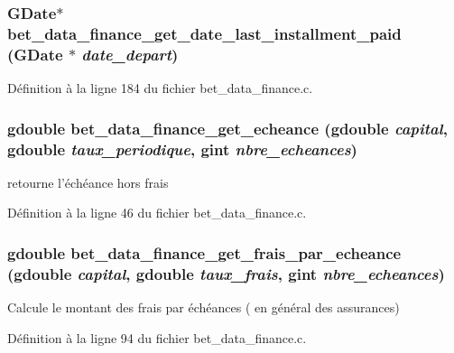 \subsubsection[{bet\_\-data\_\-finance\_\-get\_\-date\_\-last\_\-installment\_\-paid}]{\setlength{\rightskip}{0pt plus 5cm}GDate$\ast$ bet\_\-data\_\-finance\_\-get\_\-date\_\-last\_\-installment\_\-paid (GDate $\ast$ {\em date\_\-depart})}\label{bet__data__finance_8h_a458866f9c7b31421885e2c6a6907b35a}


Définition à la ligne 184 du fichier bet\_\-data\_\-finance.c.

\subsubsection[{bet\_\-data\_\-finance\_\-get\_\-echeance}]{\setlength{\rightskip}{0pt plus 5cm}gdouble bet\_\-data\_\-finance\_\-get\_\-echeance (gdouble {\em capital}, \/  gdouble {\em taux\_\-periodique}, \/  gint {\em nbre\_\-echeances})}\label{bet__data__finance_8h_a547a8aeeaa739cf8fb7e59ab11c2fec7}
retourne l'échéance hors frais 

Définition à la ligne 46 du fichier bet\_\-data\_\-finance.c.

\subsubsection[{bet\_\-data\_\-finance\_\-get\_\-frais\_\-par\_\-echeance}]{\setlength{\rightskip}{0pt plus 5cm}gdouble bet\_\-data\_\-finance\_\-get\_\-frais\_\-par\_\-echeance (gdouble {\em capital}, \/  gdouble {\em taux\_\-frais}, \/  gint {\em nbre\_\-echeances})}\label{bet__data__finance_8h_ac0231e5d0ce8fea81b31249558bde098}
Calcule le montant des frais par échéances ( en général des assurances) 

Définition à la ligne 94 du fichier bet\_\-data\_\-finance.c.

